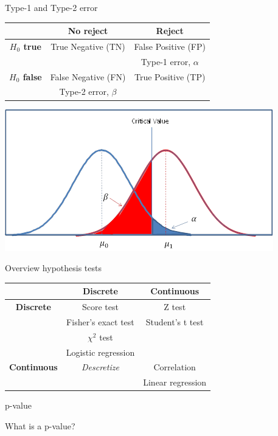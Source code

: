 \documentclass{beamer}\usepackage[]{graphicx}\usepackage[]{color}
\begin{document}
\begin{frame}{Type-1 and Type-2 error}
  \begin{table}
    \begin{tabular}{c|c|c}
      \toprule
      & \textbf{No reject} & \textbf{Reject} \\ \hline
      \textbf{$H_0$ true} & True Negative (TN) & {\color{blue} False Positive (FP)} \\
      & & {\color{blue} Type-1 error, $\alpha$} \\
      \textbf{$H_0$ false} & {\color{red} False Negative (FN)} & True Positive (TP) \\
      &  {\color{red}  Type-2 error, $\beta$} & \\
      \bottomrule
    \end{tabular}
  \end{table}
  \begin{center}
    \includegraphics[width=.5\linewidth]{ht_error.png}
  \end{center}
\end{frame}

\begin{frame}{Overview hypothesis tests}
  \begin{table}
    \begin{tabular}{c|c|c}
      \toprule
      & \textbf{Discrete} & \textbf{Continuous} \\ \hline
      \textbf{Discrete} & Score test & Z test \\
      & Fisher's exact test & Student's t test \\
      & $\chi^2$ test & \\
      & Logistic regression & \\ \hline
      \textbf{Continuous} & \textit{Descretize} & Correlation \\
      &  & Linear regression \\
      \bottomrule
    \end{tabular}
  \end{table}
\end{frame}

\begin{frame}{p-value}
  \begin{center}
    \Large
    What is a p-value?
  \end{center}
\end{frame}
\end{document}
